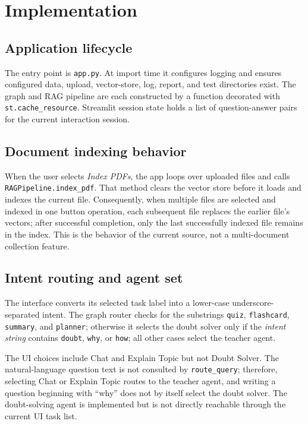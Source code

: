 \chapter{Implementation}
\label{ch:implementation}

\section{Application lifecycle}
The entry point is \texttt{app.py}. At import time it configures logging and ensures configured data, upload, vector-store, log, report, and test directories exist. The graph and RAG pipeline are each constructed by a function decorated with \texttt{st.cache\_resource}. Streamlit session state holds a list of question-answer pairs for the current interaction session.

\section{Document indexing behavior}
When the user selects \textit{Index PDFs}, the app loops over uploaded files and calls \texttt{RAGPipeline.index\_pdf}. That method clears the vector store before it loads and indexes the current file. Consequently, when multiple files are selected and indexed in one button operation, each subsequent file replaces the earlier file's vectors; after successful completion, only the last successfully indexed file remains in the index. This is the behavior of the current source, not a multi-document collection feature.

\section{Intent routing and agent set}
The interface converts its selected task label into a lower-case underscore-separated intent. The graph router checks for the substrings \texttt{quiz}, \texttt{flashcard}, \texttt{summary}, and \texttt{planner}; otherwise it selects the doubt solver only if the \emph{intent string} contains \texttt{doubt}, \texttt{why}, or \texttt{how}; all other cases select the teacher agent.

The UI choices include Chat and Explain Topic but not Doubt Solver. The natural-language question text is not consulted by \texttt{route\_query}; therefore, selecting Chat or Explain Topic routes to the teacher agent, and writing a question beginning with ``why'' does not by itself select the doubt solver. The doubt-solving agent is implemented but is not directly reachable through the current UI task list.

